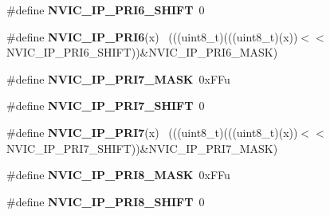 \begin{DoxyCompactItemize}
\item 
\hypertarget{group___n_v_i_c___register___masks_gacc6a98b0d2caedef82001277ba4ad760}{}\#define {\bfseries N\+V\+I\+C\+\_\+\+I\+P\+\_\+\+P\+R\+I6\+\_\+\+S\+H\+I\+F\+T}~0\label{group___n_v_i_c___register___masks_gacc6a98b0d2caedef82001277ba4ad760}

\item 
\hypertarget{group___n_v_i_c___register___masks_ga2ed954fed7811adcb9c5360cf2670731}{}\#define {\bfseries N\+V\+I\+C\+\_\+\+I\+P\+\_\+\+P\+R\+I6}(x)                                                ~(((uint8\+\_\+t)(((uint8\+\_\+t)(x))$<$$<$N\+V\+I\+C\+\_\+\+I\+P\+\_\+\+P\+R\+I6\+\_\+\+S\+H\+I\+F\+T))\&N\+V\+I\+C\+\_\+\+I\+P\+\_\+\+P\+R\+I6\+\_\+\+M\+A\+S\+K)\label{group___n_v_i_c___register___masks_ga2ed954fed7811adcb9c5360cf2670731}

\item 
\hypertarget{group___n_v_i_c___register___masks_ga53234b1783798e957f5e34a7e8ff07f4}{}\#define {\bfseries N\+V\+I\+C\+\_\+\+I\+P\+\_\+\+P\+R\+I7\+\_\+\+M\+A\+S\+K}~0x\+F\+Fu\label{group___n_v_i_c___register___masks_ga53234b1783798e957f5e34a7e8ff07f4}

\item 
\hypertarget{group___n_v_i_c___register___masks_ga4bdd4a859bde67e42af6aed5438d0b63}{}\#define {\bfseries N\+V\+I\+C\+\_\+\+I\+P\+\_\+\+P\+R\+I7\+\_\+\+S\+H\+I\+F\+T}~0\label{group___n_v_i_c___register___masks_ga4bdd4a859bde67e42af6aed5438d0b63}

\item 
\hypertarget{group___n_v_i_c___register___masks_gac8b5a26fa67222209e56261da0e07f1a}{}\#define {\bfseries N\+V\+I\+C\+\_\+\+I\+P\+\_\+\+P\+R\+I7}(x)                                                ~(((uint8\+\_\+t)(((uint8\+\_\+t)(x))$<$$<$N\+V\+I\+C\+\_\+\+I\+P\+\_\+\+P\+R\+I7\+\_\+\+S\+H\+I\+F\+T))\&N\+V\+I\+C\+\_\+\+I\+P\+\_\+\+P\+R\+I7\+\_\+\+M\+A\+S\+K)\label{group___n_v_i_c___register___masks_gac8b5a26fa67222209e56261da0e07f1a}

\item 
\hypertarget{group___n_v_i_c___register___masks_ga40bd92bf1d3e99163cfab70619a16f18}{}\#define {\bfseries N\+V\+I\+C\+\_\+\+I\+P\+\_\+\+P\+R\+I8\+\_\+\+M\+A\+S\+K}~0x\+F\+Fu\label{group___n_v_i_c___register___masks_ga40bd92bf1d3e99163cfab70619a16f18}

\item 
\hypertarget{group___n_v_i_c___register___masks_ga5fdaa91b04e267ff4519ac7b8b58ba82}{}\#define {\bfseries N\+V\+I\+C\+\_\+\+I\+P\+\_\+\+P\+R\+I8\+\_\+\+S\+H\+I\+F\+T}~0\label{group___n_v_i_c___register___masks_ga5fdaa91b04e267ff4519ac7b8b58ba82}


\end{DoxyCompactItemize}
